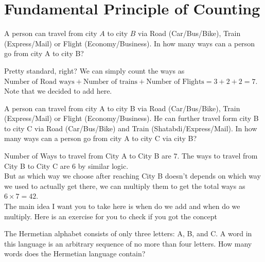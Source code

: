 \section{Fundamental Principle of Counting}
\begin{example}
A person can travel from city $A$ to city $B$ via Road (Car/Bus/Bike), Train (Express/Mail) or Flight (Economy/Business).
In how many ways can a person go from city A to city B?
\end{example}
Pretty standard, right? We can simply count the ways as $\text{Number of Road ways}+\text{Number of trains}+\text{Number of Flights}=3+2+2=7$. Note that we decided to add here.\\
\begin{example}
    A person can travel from city A to city B via Road (Car/Bus/Bike), Train (Express/Mail) or Flight (Economy/Business). He can further travel form city B to city C via Road (Car/Bus/Bike) and Train (Shatabdi/Express/Mail). In how many ways can a person go from city A to city C via city B?
\end{example}
Number of Ways to travel from City A to City B are $7$. The ways to travel from City B to City C are $6$ by similar logic.\\
But as which way we choose after reaching City B doesn't depends on which way we used to actually get there, we can multiply them to get the total ways as $6 \times 7=42$.\\
The main idea I want you to take here is when do we add and when do we multiply. Here is an exercise for you to check if you got the concept\\
\begin{example}
The Hermetian alphabet consists of only three letters: A, B, and C. A word in this language is an arbitrary sequence of no more than four letters. How many words does the Hermetian language contain?
\end{example}
